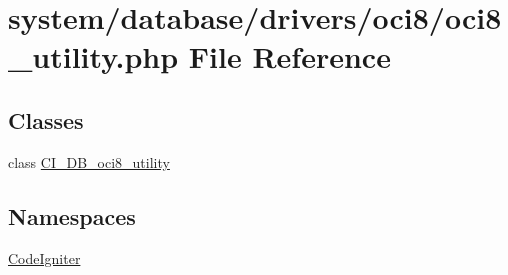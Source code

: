 \hypertarget{oci8__utility_8php}{}\section{system/database/drivers/oci8/oci8\+\_\+utility.php File Reference}
\label{oci8__utility_8php}
\subsection*{Classes}
\begin{DoxyCompactItemize}
\item 
class \mbox{\hyperlink{class_c_i___d_b__oci8__utility}{C\+I\+\_\+\+D\+B\+\_\+oci8\+\_\+utility}}
\end{DoxyCompactItemize}
\subsection*{Namespaces}
\begin{DoxyCompactItemize}
\item 
 \mbox{\hyperlink{namespace_code_igniter}{Code\+Igniter}}
\end{DoxyCompactItemize}
